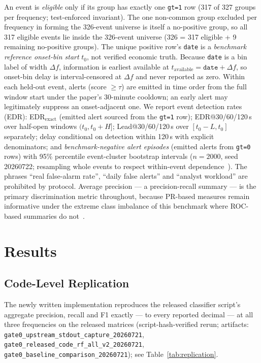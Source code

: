 \documentclass[runningheads]{llncs}
\begin{document}
An event is \emph{eligible} only if its group has exactly one
\texttt{gt=1} row (317 of 327 groups per frequency; test-enforced
invariant). The one non-common group excluded per frequency in forming
the 326-event universe is itself a no-positive group, so all 317
eligible events lie inside the 326-event universe (326 = 317 eligible +
9 remaining no-positive groups). The unique positive row's
\texttt{date} is a \emph{benchmark reference onset-bin start} $t_0$,
not verified economic truth. Because \texttt{date} is a bin label of
width $\Delta f$, information is earliest available at
$t_{\mathrm{available}} = \texttt{date} + \Delta f$, so onset-bin delay
is interval-censored at $\Delta f$ and never reported as zero. Within
each held-out event, alerts (score $\geq \tau$) are emitted in time
order from the full window start under the paper's 30-minute cooldown;
an early alert may legitimately suppress an onset-adjacent one. We
report event detection rates (EDR): EDR$_{\mathrm{exact}}$ (emitted
alert sourced from the \texttt{gt=1} row); EDR@30/60/120\,s over
half-open windows $(t_0, t_0+H]$; Lead@30/60/120\,s over $[t_0-L,
t_0]$ separately; delay conditional on detection within 120\,s with
explicit denominators; and \emph{benchmark-negative alert episodes}
(emitted alerts from \texttt{gt=0} rows) with 95\% percentile
event-cluster bootstrap intervals ($n=2000$, seed 20260722; resampling
whole events to respect within-event dependence~\cite{Field2007}). The
phrases ``real false-alarm rate'', ``daily false alerts'' and ``analyst
workload'' are prohibited by protocol. Average precision --- a
precision-recall summary --- is the primary discrimination metric
throughout, because PR-based measures remain informative under the
extreme class imbalance of this benchmark where ROC-based summaries do
not~\cite{Saito2015}.

\section{Results}\label{sec:results}

\subsection{Code-Level Replication}\label{sec:replication}

The newly written implementation reproduces the released classifier
script's aggregate precision, recall and F1 exactly --- to every
reported decimal --- at all three frequencies on the released matrices
(script-hash-verified rerun; artifacts:
\texttt{gate0\_upstream\_stdout\_capture\_20260721},
\texttt{gate0\_released\_code\_rf\_all\_v2\_20260721},
\texttt{gate0\_baseline\_comparison\_20260721});
see Table~\ref{tab:replication}.
\end{document}
